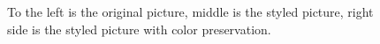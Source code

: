 \begin{figure}[!ht]
\begin{center}
\label{color preserved cat}
\caption{To the left is the original picture, middle is the styled picture, right side is the styled picture with color preservation.}
\end{center}
\end{figure}
\newpage



